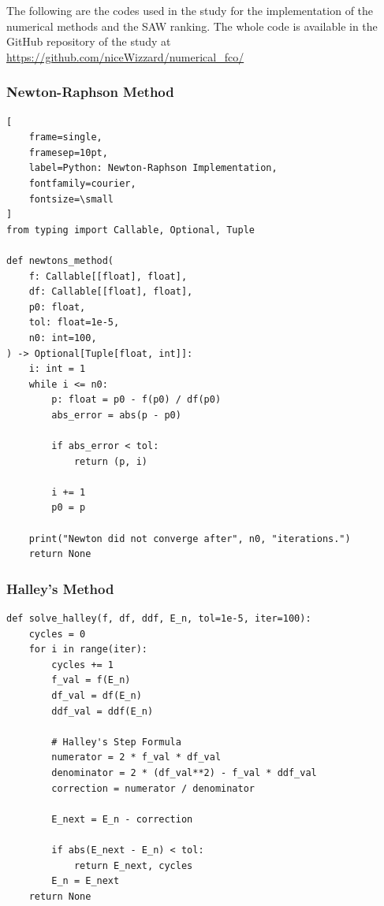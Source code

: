 \documentclass[a4paper,11pt]{article}
\begin{document}
The following are the codes used in the study for the implementation of the numerical methods and the SAW ranking.
The whole code is available in the GitHub repository of the study at \url{https://github.com/niceWizzard/numerical_fco/}

\subsubsection{Newton-Raphson Method}

\begin{Verbatim}[
    frame=single, 
    framesep=10pt, 
    label=Python: Newton-Raphson Implementation,
    fontfamily=courier,
    fontsize=\small
]
from typing import Callable, Optional, Tuple

def newtons_method(
    f: Callable[[float], float], 
    df: Callable[[float], float], 
    p0: float, 
    tol: float=1e-5, 
    n0: int=100,
) -> Optional[Tuple[float, int]]:
    i: int = 1
    while i <= n0:
        p: float = p0 - f(p0) / df(p0)
        abs_error = abs(p - p0)
        
        if abs_error < tol:
            return (p, i)
        
        i += 1
        p0 = p
        
    print("Newton did not converge after", n0, "iterations.")
    return None
\end{Verbatim}

\subsubsection{Halley's Method}
\begin{Verbatim}[frame=single, framesep=10pt, label=Python: Halley's Method]
def solve_halley(f, df, ddf, E_n, tol=1e-5, iter=100):
    cycles = 0
    for i in range(iter):
        cycles += 1
        f_val = f(E_n)
        df_val = df(E_n)
        ddf_val = ddf(E_n)
        
        # Halley's Step Formula
        numerator = 2 * f_val * df_val
        denominator = 2 * (df_val**2) - f_val * ddf_val
        correction = numerator / denominator
        
        E_next = E_n - correction
        
        if abs(E_next - E_n) < tol:
            return E_next, cycles
        E_n = E_next
    return None
\end{Verbatim}
\end{document}
